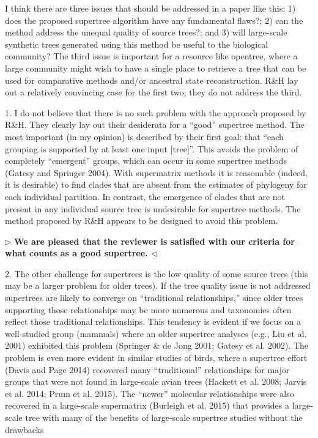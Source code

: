 \documentclass{article}
\newenvironment{reply}{$\triangleright$\bf}{$\triangleleft$}
\begin{document}
I think there are three issues that should be addressed in a paper like this: 1) does the proposed supertree algorithm have any fundamental flaws?; 2) can the method address the unequal quality of source trees?; and 3) will large-scale synthetic trees generated using this method be useful to the biological community? The third issue is important for a resource like opentree, where a large community might wish to have a single place to retrieve a tree that can be used for comparative methods and/or ancestral state reconstruction. R\&H lay out a relatively convincing case for the first two; they do not address the third.


1. I do not believe that there is no such problem with the approach proposed by R\&H. They clearly lay out their desiderata for a “good” supertree method. The most important (in my opinion) is described by their first goal: that “each grouping is supported by at least one input [tree]”. This avoids the problem of completely “emergent” groups, which can occur in some supertree methods (Gatesy and Springer 2004). With supermatrix methods it is reasonable (indeed, it is desirable) to find clades that are absent from the estimates of phylogeny for each individual partition. In contrast, the emergence of clades that are not present in any individual source tree is undesirable for supertree methods. The method proposed by R\&H appears to be designed to avoid this problem.

\begin{reply}
We are pleased that the reviewer is satisfied with our criteria for what counts as a good supertree.
\end{reply}

2. The other challenge for supertrees is the low quality of some source trees (this may be a larger problem for older trees). If the tree quality issue is not addressed supertrees are likely to converge on “traditional relationships,” since older trees supporting those relationships may be more numerous and taxonomies often reflect those traditional relationships. This tendency is evident if we focus on a well-studied group (mammals) where an older supertree analyses (e.g., Liu et al. 2001) exhibited this problem (Springer \& de Jong 2001; Gatesy et al. 2002). The problem is even more evident in similar studies of birds, where a supertree effort (Davis and Page 2014) recovered many “traditional” relationships for major groups that were not found in large-scale avian trees (Hackett et al. 2008; Jarvis et al. 2014; Prum et al. 2015). The “newer” molecular relationships were also recovered in a large-scale supermatrix (Burleigh et al. 2015) that provides a large-scale tree with many of the benefits of large-scale supertree studies without the drawbacks
\end{document}

